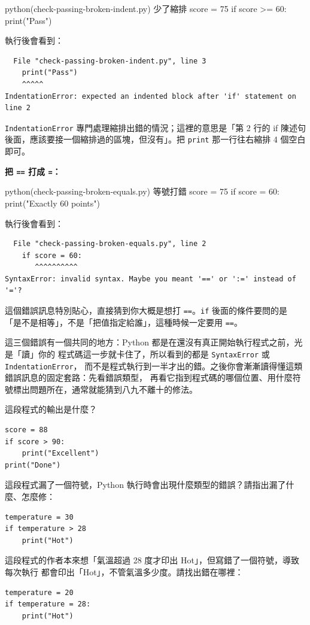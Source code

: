 \begin{example}{python}{(check-passing-broken-indent.py) 少了縮排}
score = 75
if score >= 60:
print("Pass")
\end{example}

執行後會看到：

\begin{verbatim}
  File "check-passing-broken-indent.py", line 3
    print("Pass")
    ^^^^^
IndentationError: expected an indented block after 'if' statement on line 2
\end{verbatim}

\texttt{IndentationError} 專門處理縮排出錯的情況；這裡的意思是「第 2 行的 if 陳述句
後面，應該要接一個縮排過的區塊，但沒有」。把 \texttt{print} 那一行往右縮排 4 個空白
即可。

\textbf{把 \texttt{==} 打成 \texttt{=}：}

\begin{example}{python}{(check-passing-broken-equals.py) 等號打錯}
score = 75
if score = 60:
    print("Exactly 60 points")
\end{example}

執行後會看到：

\begin{verbatim}
  File "check-passing-broken-equals.py", line 2
    if score = 60:
       ^^^^^^^^^^
SyntaxError: invalid syntax. Maybe you meant '==' or ':=' instead of '='?
\end{verbatim}

這個錯誤訊息特別貼心，直接猜到你大概是想打 \texttt{==}。\texttt{if} 後面的條件要問的是
「是不是相等」，不是「把值指定給誰」，這種時候一定要用 \texttt{==}。

這三個錯誤有一個共同的地方：Python 都是在還沒有真正開始執行程式之前，光是「讀」你的
程式碼這一步就卡住了，所以看到的都是 \texttt{SyntaxError} 或 \texttt{IndentationError}，
而不是程式執行到一半才出的錯。之後你會漸漸讀得懂這類錯誤訊息的固定套路：先看錯誤類型，
再看它指到程式碼的哪個位置、用什麼符號標出問題所在，通常就能猜到八九不離十的修法。

\begin{drills}[label=drills:if-basics]
\item 這段程式的輸出是什麼？
\begin{verbatim}
score = 88
if score > 90:
    print("Excellent")
print("Done")
\end{verbatim}
\item 這段程式漏了一個符號，Python 執行時會出現什麼類型的錯誤？請指出漏了什麼、怎麼修：
\begin{verbatim}
temperature = 30
if temperature > 28
    print("Hot")
\end{verbatim}
\item 這段程式的作者本來想「氣溫超過 28 度才印出 Hot」，但寫錯了一個符號，導致每次執行
都會印出「Hot」，不管氣溫多少度。請找出錯在哪裡：
\begin{verbatim}
temperature = 20
if temperature = 28:
    print("Hot")
\end{verbatim}
\end{drills}

